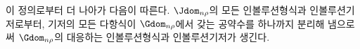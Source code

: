 
이 정의로부터 더 나아가 다음이 따른다. $\Jdom_{n\rho}$의 모든 인볼루션형식과 인볼루션기저로부터, 기저의 모든 다항식이 $\Gdom_{n\rho}$에서 갖는 공약수를 하나까지 분리해 냄으로써 $\Gdom_{n\rho}$의 대응하는 인볼루션형식과 인볼루션기저가 생긴다.
